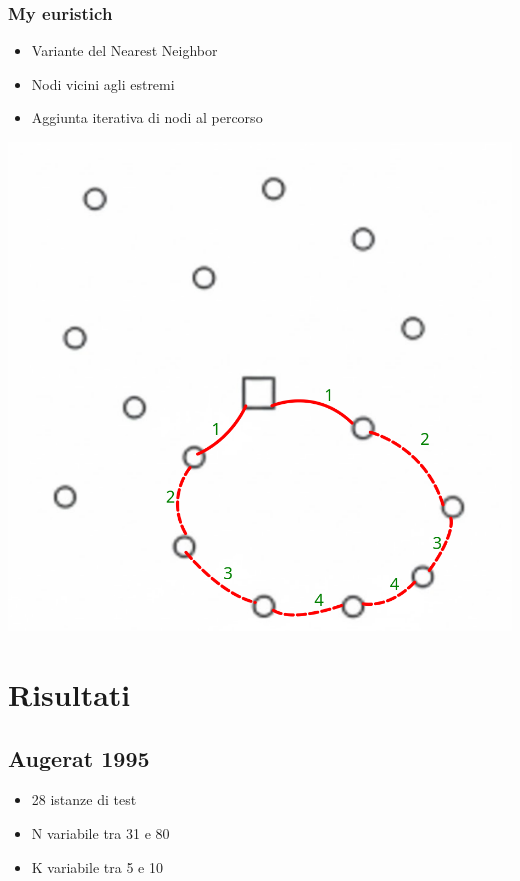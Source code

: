\documentclass[compress]{beamer}
\begin{document}
\subsubsection{My euristich}
\begin{frame}{\subsubsecname}
    
    \begin{minipage}{0.49\textwidth}
        \begin{itemize}
        \item Variante del Nearest Neighbor
        \item Nodi vicini agli estremi
        \item Aggiunta iterativa di nodi al percorso
    \end{itemize}
    \end{minipage}
    \begin{minipage}{0.49\textwidth}
        \centering
        \includegraphics[width=0.8\linewidth]{images/my_euristich.png}
    \end{minipage}
\end{frame}

\section{Risultati}

\subsection{Augerat 1995}

\begin{frame}{\subsecname}
    \begin{center}
        \begin{itemize}
            \item 28 istanze di test
            \item N variabile tra 31 e 80
            \item K variabile tra 5 e 10
        \end{itemize}
    \end{center}
\end{frame}
\end{document}
